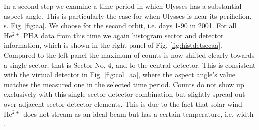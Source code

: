 In a second step we examine a time period in which Ulysses has a substantial aspect angle. This is particularly the case for when Ulysses is near its perihelion, s. Fig~\ref{fig:aa}. We choose for the second orbit, i.e. days 1-90 in 2001. For all $\mathrm{He^{2+}}$ PHA data from this time we again histogram sector and detector information, which is shown in the right panel of Fig. \ref{fig:histdetsecaa}. Compared to the left panel the maximum of counts is now shifted clearly towards a single sector, that is Sector No. 4, and to the central detector. This is consistent with the virtual detector in Fig. \ref{fig:col_aa}, where the aspect angle's value matches the measured one in the selected time period. Counts do not show up exclusively with this single sector-detector combination but slightly spread out over adjacent sector-detector elements. This is due to the fact that solar wind $\mathrm{He^{2+}}$ does not stream as an ideal beam but has a certain temperature, i.e. width \citep[][,Ch. 6.1]{prlss_2004}.


